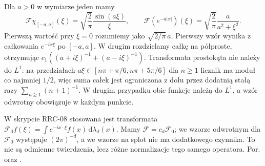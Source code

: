 \begin{przyklad}
\label{ex:dt-fourier-l1-pairs}
Dla $a>0$ w wymiarze jeden mamy
\[
 \mathcal F\chi_{[-a,a]}(\xi)
 =\sqrt{\frac{2}{\pi}}\frac{\sin(a\xi)}{\xi},
 \qquad
 \mathcal F(e^{-a|x|})(\xi)
 =\sqrt{\frac{2}{\pi}}\frac{a}{a^2+\xi^2}.
\]
Pierwszą wartość przy $\xi=0$ rozumiemy jako
$\sqrt{2/\pi}\,a$. Pierwszy wzór wynika z całkowania
$e^{-ix\xi}$ po $[-a,a]$. W drugim rozdzielamy całkę
na półproste, otrzymując
$c_1((a+i\xi)^{-1}+(a-i\xi)^{-1})$.
Transformata prostokąta nie należy do $L^1$: na
przedziałach $a\xi\in[n\pi+\pi/6,n\pi+5\pi/6]$
dla $n\ge1$ licznik ma moduł co najmniej $1/2$,
więc suma całek jest ograniczona z dołu przez
dodatnią stałą razy $\sum_{n\ge1}(n+1)^{-1}$.
W drugim przypadku obie funkcje należą do $L^1$,
a wzór odwrotny obowiązuje w każdym punkcie.
\end{przyklad}

\begin{uwaga}
\label{rem:dt-fourier-normalization-rrc}
W skrypcie RRC-08 stosowana jest transformata
$\mathcal F_0f(\xi)=\int e^{-ix\cdot\xi}f(x)
\,\mathrm d\lambda_d(x)$. Mamy $\mathcal F=c_d\mathcal F_0$;
we wzorze odwrotnym dla $\mathcal F_0$ występuje
$(2\pi)^{-d}$, a we wzorze na splot nie ma dodatkowego
czynnika. To nie są odmienne twierdzenia, lecz różne
normalizacje tego samego operatora. Por.
oraz
.
\end{uwaga}
